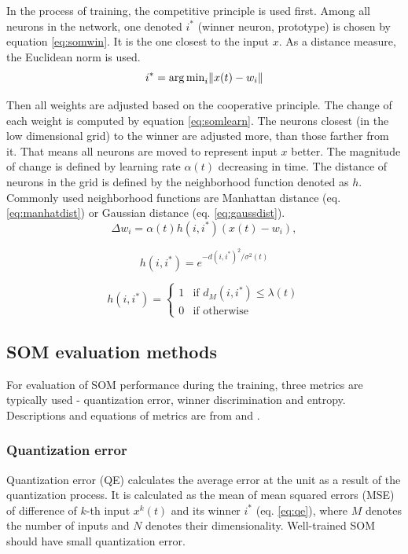In the process of training, the competitive principle is used first. Among all neurons in the network, one denoted $i^*$ (winner neuron, prototype) is chosen by equation \ref{eq:somwin}. It is the one closest to the input $x$. As a distance measure, the Euclidean norm is used.
\begin{equation}
	\label{eq:somwin}
	i^* = {\operatorname*{arg\,min}}_i \|{x}(t)-{w}_i\|
\end{equation}

Then all weights are adjusted based on the cooperative principle. The change of each weight is computed by equation \ref{eq:somlearn}. The neurons closest (in the low dimensional grid) to the winner are adjusted more, than those farther from it. That means all neurons are moved to represent input $x$ better. The magnitude of change is defined by learning rate $\alpha(t)$ decreasing in time. The distance of neurons in the grid is defined by the neighborhood function denoted as $h$. Commonly used neighborhood functions are Manhattan distance (eq. \ref{eq:manhatdist}) or Gaussian distance (eq. \ref{eq:gaussdist}). 
\begin{equation}
	\label{eq:somlearn}
	\Delta{w}_i = \alpha(t) h(i,i^*) ({x}(t)-{w}_i),
\end{equation}


\begin{equation}
	\label{eq:gaussdist}
	h(i,i^*) = e^{-d(i,i^*)^2/{\sigma}^2(t)}
\end{equation}

\begin{equation}
	\label{eq:manhatdist}
	h(i,i^*) = \begin{cases}
		1  & \mbox{if } d_M(i,i^*)\le{\lambda}(t) \\
		0  & \mbox{if } \text{otherwise}%
	\end{cases}
\end{equation}

\subsection{SOM evaluation methods}
For evaluation of SOM performance during the training, three metrics are typically used - quantization error, winner discrimination and entropy. Descriptions and equations of metrics are from \cite{rebrova2013} and \cite{vanco2010-som}.

\subsubsection{Quantization error}
Quantization error (QE) calculates the average error at the unit as a result of the quantization process. It is calculated as the mean of mean squared errors (MSE) of difference of $k$-th input $x^k(t)$ and its winner $i^*$ (eq. \ref{eq:qe}), where $M$ denotes the number of inputs and $N$ denotes their dimensionality. Well-trained SOM should have small quantization error.

